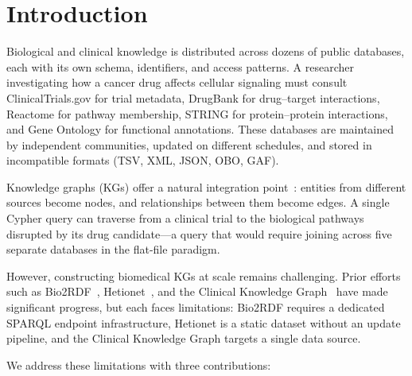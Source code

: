 \documentclass[11pt]{article}
\begin{document}
\section{Introduction}

Biological and clinical knowledge is distributed across dozens of public databases, each with its own schema, identifiers, and access patterns. A researcher investigating how a cancer drug affects cellular signaling must consult ClinicalTrials.gov for trial metadata, DrugBank for drug--target interactions, Reactome for pathway membership, STRING for protein--protein interactions, and Gene Ontology for functional annotations. These databases are maintained by independent communities, updated on different schedules, and stored in incompatible formats (TSV, XML, JSON, OBO, GAF).

Knowledge graphs (KGs) offer a natural integration point~\citep{hogan2021knowledge}: entities from different sources become nodes, and relationships between them become edges. A single Cypher query can traverse from a clinical trial to the biological pathways disrupted by its drug candidate---a query that would require joining across five separate databases in the flat-file paradigm.

However, constructing biomedical KGs at scale remains challenging. Prior efforts such as Bio2RDF~\citep{belleau2008bio2rdf}, Hetionet~\citep{himmelstein2017systematic}, and the Clinical Knowledge Graph~\citep{santos2022clinical} have made significant progress, but each faces limitations: Bio2RDF requires a dedicated SPARQL endpoint infrastructure, Hetionet is a static dataset without an update pipeline, and the Clinical Knowledge Graph targets a single data source.

We address these limitations with three contributions:
\end{document}
